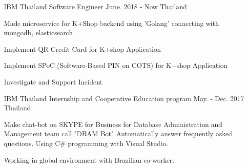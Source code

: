 

\begin{cventries}

  \cventry
    {IBM Thailand} %
    {Software Engineer} %
    {June. 2018 - Now} %
    {Thailand} %
    {
      \begin{cvitems} %
        \item {Made microservice for K+Shop backend using 'Golang' connecting with mongodb, elasticsearch}
        \item {Implement QR Credit Card for K+shop Application}
        \item {Implement SPoC (Software-Based PIN on COTS) for K+shop Application}
        \item {Investigate and Support Incident}
      \end{cvitems}
    }

 \cventry
    {IBM Thailand} %
    {Internship and Cooperative Education program} %
    {May. - Dec. 2017} %
    {Thailand} %
    {
      \begin{cvitems} %
        \item {Make chat-bot on SKYPE for Business for Database Administration and Management team call "DBAM Bot" Automatically answer frequently asked questions. Using C\# programming with Visual Studio.}
        \item {Working in global environment with Brazilian co-worker.}
      \end{cvitems}
    }

\end{cventries}
